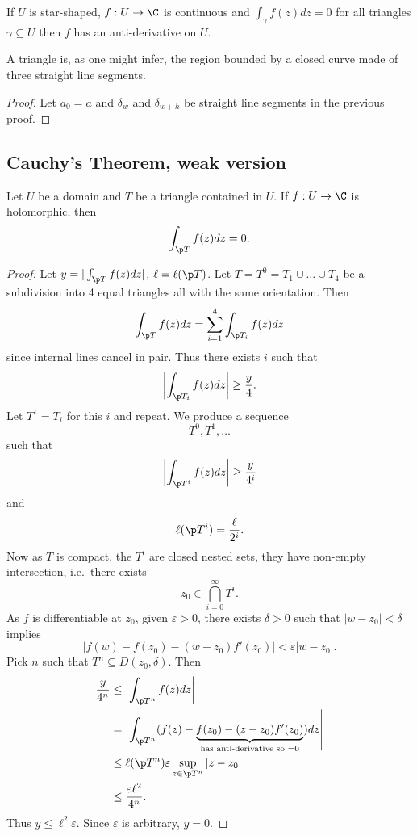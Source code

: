 \documentclass[a4paper]{article}
\begin{document}
\begin{corollary}\label{cor:anti-derivative}
  If \(U\) is star-shaped, \(f: U \to \C\) is continuous and \(\int_\gamma f(z)dz = 0\) for all triangles \(\gamma \subseteq U\) then \(f\) has an anti-derivative on \(U\).
\end{corollary}

A triangle is, as one might infer, the region bounded by a closed curve made of three straight line segments.

\begin{proof}
  Let \(a_0 = a\) and \(\delta_w\) and \(\delta_{w + h}\) be straight line segments in the previous proof.
\end{proof}

\subsection{Cauchy's Theorem, weak version}

\begin{theorem}
  \label{thm:weak Cauchy}
  Let \(U\) be a domain and \(T\) be a triangle contained in \(U\). If \(f: U \to \C\) is holomorphic, then
  \[
    \int_{\p T} f(z)dz = 0.
  \]
\end{theorem}

\begin{proof}
  Let \(y = |\int_{\p T} f(z)dz|\), \(\ell = \ell(\p T)\). Let \(T = T^0 = T_1 \cup \dots \cup T_4\) be a subdivision into 4 equal triangles all with the same orientation. Then
  \[
    \int_{\p T} f(z)dz = \sum_{i = 1}^4 \int_{\p T_i} f(z)dz
  \]
  since internal lines cancel in pair. Thus there exists \(i\) such that
  \[
    \left| \int_{\p T_i} f(z)dz \right| \geq \frac{y}{4}.
  \]
  Let \(T^1 = T_i\) for this \(i\) and repeat. We produce a sequence
  \[
    T^0, T^1, \dots
  \]
  such that
  \[
    \left| \int_{\p T^i} f(z)dz \right| \geq \frac{y}{4^i}
  \]
  and
  \[
    \ell(\p T^i) = \frac{\ell}{2^i}.
  \]
  Now as \(T\) is compact, the \(T^i\) are closed nested sets, they have non-empty intersection, i.e.\ there exists
  \[
    z_0 \in \bigcap_{i = 0}^\infty T^i.
  \]
  As \(f\) is differentiable at \(z_0\), given \(\varepsilon > 0\), there exists \(\delta > 0\) such that \(|w - z_0| < \delta\) implies
  \[
    |f(w) - f(z_0) - (w - z_0) f'(z_0)| < \varepsilon |w - z_0|.
  \]
  Pick \(n\) such that \(T^n \subseteq D(z_0, \delta)\). Then
  \begin{align*}
    \frac{y}{4^n} &\leq \left| \int_{\p T^n} f(z)dz \right| \\
                  &= \left| \int_{\p T^n} (f(z) - \underbrace{f(z_0) - (z - z_0)f'(z_0)}_{\text{has anti-derivative so } = 0}) dz \right| \\
                  &\leq \ell(\p T^n) \varepsilon \sup_{z \in \p T^n} |z - z_0| \\
                  &\leq \frac{\varepsilon \ell^2}{4^n}.
  \end{align*}
  Thus \(y \leq \ell^2 \varepsilon\). Since \(\varepsilon\) is arbitrary, \(y = 0\).
\end{proof}
\end{document}
